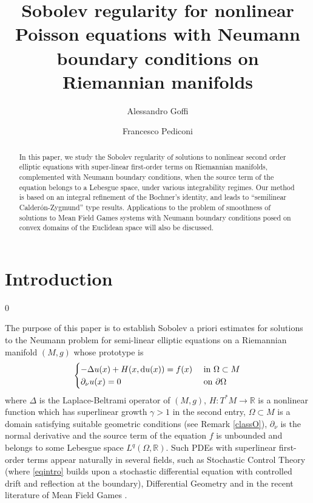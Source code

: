 \documentclass[10pt, a4paper, reqno, oneside]{amsart}
\title[]{Sobolev regularity for nonlinear Poisson equations with Neumann boundary conditions on Riemannian manifolds}
\author{Alessandro Goffi}
\author{Francesco Pediconi}
\theoremstyle{plain}
\theoremstyle{definition}
\theoremstyle{plain}
\theoremstyle{definition}
\theoremstyle{plain}
\renewcommand{\=}{:=}
\begin{document}
\begin{abstract}
In this paper, we study the Sobolev regularity of solutions to nonlinear second order elliptic equations with super-linear first-order terms on Riemannian manifolds, complemented with Neumann boundary conditions, when the source term of the equation belongs to a Lebesgue space, under various integrability regimes. Our method is based on an integral refinement of the Bochner's identity, and leads to ``semilinear Calder\'on-Zygmund'' type results. Applications to the problem of smoothness of solutions to Mean Field Games systems with Neumann boundary conditions posed on convex domains of the Euclidean space will also be discussed.
\end{abstract}

\maketitle


\section{Introduction}
\setcounter{equation} 0

The purpose of this paper is to establish Sobolev a priori estimates for solutions to the Neumann problem for semi-linear elliptic equations on a Riemannian manifold $(M,g)$ whose prototype is
\begin{equation} \label{eqintro}
\begin{cases}
-\Delta u(x)+H(x,{\rm d}u(x))=f(x) & \text{ in } \Omega \subset M \\
\partial_\nu u(x) =0 & \text{ on } \partial\Omega
\end{cases}
\end{equation}
where $\Delta$ is the Laplace-Beltrami operator of $(M,g)$, $H: T^*M \to \mathbb{R}$ is a nonlinear function which has superlinear growth $\gamma>1$ in the second entry, $\Omega \subset M$ is a domain satisfying suitable geometric conditions (see Remark \ref{classO}), $\partial_\nu$ is the normal derivative and the source term of the equation $f$ is unbounded and belongs to some Lebesgue space $L^q(\Omega,\mathbb{R})$. Such PDEs with superlinear first-order terms appear naturally in several fields, such as Stochastic Control Theory \cite{BF} (where \eqref{eqintro} builds upon a stochastic differential equation with controlled drift and reflection at the boundary), Differential Geometry \cite{EellsSampson} and in the recent literature of Mean Field Games \cite{LL07}.
\end{document}

